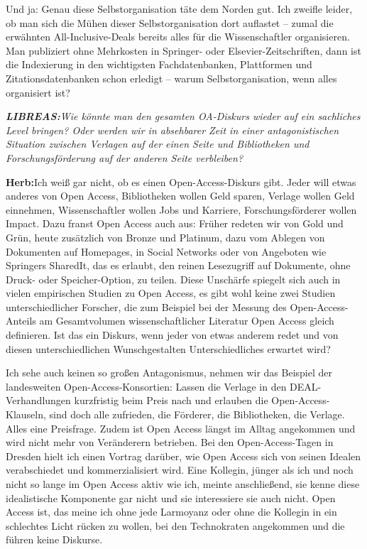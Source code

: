 \documentclass[a4paper,
fontsize=11pt,
oneside,
numbers=noperiodatend,
parskip=half-,
bibliography=totoc,
final
]{scrartcl}
\begin{document}
Und ja: Genau diese Selbstorganisation täte dem Norden gut. Ich zweifle
leider, ob man sich die Mühen dieser Selbstorganisation dort auflastet
-- zumal die erwähnten All-Inclusive-Deals bereits alles für die
Wissenschaftler organisieren. Man publiziert ohne Mehrkosten in
Springer- oder Elsevier-Zeitschriften, dann ist die Indexierung in den
wichtigsten Fachdatenbanken, Plattformen und Zitationsdatenbanken schon
erledigt -- warum Selbstorganisation, wenn alles organisiert ist?

\emph{\textbf{LIBREAS:}Wie könnte man den gesamten OA-Diskurs wieder auf
ein sachliches Level bringen? Oder werden wir in absehbarer Zeit in
einer antagonistischen Situation zwischen Verlagen auf der einen Seite
und Bibliotheken und Forschungsförderung auf der anderen Seite
verbleiben?}

\textbf{Herb:}Ich weiß gar nicht, ob es einen Open-Access-Diskurs gibt.
Jeder will etwas anderes von Open Access, Bibliotheken wollen Geld
sparen, Verlage wollen Geld einnehmen, Wissenschaftler wollen Jobs und
Karriere, Forschungsförderer wollen Impact. Dazu franst Open Access auch
aus: Früher redeten wir von Gold und Grün, heute zusätzlich von Bronze
und Platinum, dazu vom Ablegen von Dokumenten auf Homepages, in Social
Networks oder von Angeboten wie Springers SharedIt, das es erlaubt, den
reinen Lesezugriff auf Dokumente, ohne Druck- oder Speicher-Option, zu
teilen. Diese Unschärfe spiegelt sich auch in vielen empirischen Studien
zu Open Access, es gibt wohl keine zwei Studien unterschiedlicher
Forscher, die zum Beispiel bei der Messung des Open-Access-Anteils am
Gesamtvolumen wissenschaftlicher Literatur Open Access gleich
definieren. Ist das ein Diskurs, wenn jeder von etwas anderem redet und
von diesen unterschiedlichen Wunschgestalten Unterschiedliches erwartet
wird?

Ich sehe auch keinen so großen Antagonismus, nehmen wir das Beispiel der
landesweiten Open-Access-Konsortien: Lassen die Verlage in den
DEAL-Verhandlungen kurzfristig beim Preis nach und erlauben die
Open-Access-Klauseln, sind doch alle zufrieden, die Förderer, die
Bibliotheken, die Verlage. Alles eine Preisfrage. Zudem ist Open Access
längst im Alltag angekommen und wird nicht mehr von Veränderern
betrieben. Bei den Open-Access-Tagen in Dresden hielt ich einen Vortrag
darüber, wie Open Access sich von seinen Idealen verabschiedet und
kommerzialisiert wird. Eine Kollegin, jünger als ich und noch nicht so
lange im Open Access aktiv wie ich, meinte anschließend, sie kenne diese
idealistische Komponente gar nicht und sie interessiere sie auch nicht.
Open Access ist, das meine ich ohne jede Larmoyanz oder ohne die
Kollegin in ein schlechtes Licht rücken zu wollen, bei den Technokraten
angekommen und die führen keine Diskurse.
\end{document}

